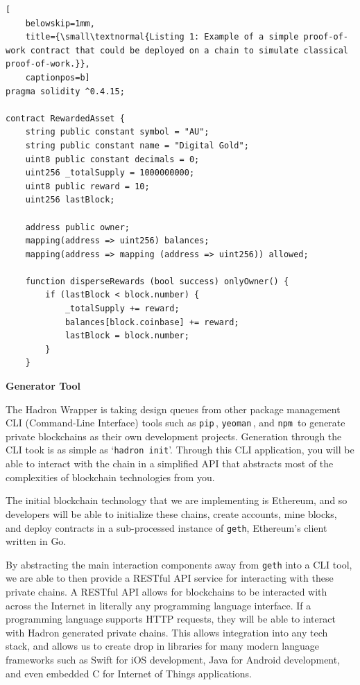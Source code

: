 \documentclass{%
	article}
\begin{document}
\begin{lstlisting}[
	belowskip=1mm,
	title={\small\textnormal{Listing 1: Example of a simple proof-of-work contract that could be deployed on a chain to simulate classical proof-of-work.}},
	captionpos=b]
pragma solidity ^0.4.15;

contract RewardedAsset {
    string public constant symbol = "AU";
    string public constant name = "Digital Gold";
    uint8 public constant decimals = 0;
    uint256 _totalSupply = 1000000000;
    uint8 public reward = 10;
    uint256 lastBlock;

    address public owner;
    mapping(address => uint256) balances;
    mapping(address => mapping (address => uint256)) allowed;

    function disperseRewards (bool success) onlyOwner() {
        if (lastBlock < block.number) {
            _totalSupply += reward;
            balances[block.coinbase] += reward;
            lastBlock = block.number;
        }
    }

\end{lstlisting}

\begin{center}
\textbf{Generator Tool}
\end{center}

The Hadron Wrapper is taking design queues from other package management CLI (Command-Line Interface) tools such as \texttt{pip}\,\cite{pip}, \texttt{yeoman}\,\cite{yeoman}, and \texttt{npm}\,\cite{npm} to generate private blockchains as their own development projects. Generation through the CLI took is as simple as ‘\texttt{hadron init}’. Through this CLI application, you will be able to interact with the chain in a simplified API that abstracts most of the complexities of blockchain technologies from you.

The initial blockchain technology that we are implementing is Ethereum, and so developers will be able to initialize these chains, create accounts, mine blocks, and deploy contracts in a sub-processed instance of \texttt{geth}, Ethereum’s client written in Go.

By abstracting the main interaction components away from \texttt{geth} into a CLI tool, we are able to then provide a RESTful API service for interacting with these private chains. A RESTful API allows for blockchains to be interacted with across the Internet in literally any programming language interface. If a programming language supports HTTP requests, they will be able to interact with Hadron generated private chains. This allows integration into any tech stack, and allows us to create drop in libraries for many modern language frameworks such as Swift for iOS development, Java for Android development, and even embedded C for Internet of Things applications.
\end{document}
